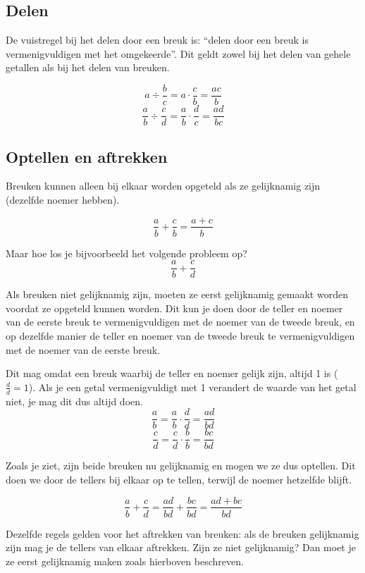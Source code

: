 \documentclass[
  a4paper,
]{scrbook}
\theoremstyle{definition}
\theoremstyle{remark}
\begin{document}
\subsection*{Delen}\label{delen}

De vuistregel bij het delen door een breuk is: ``delen door een breuk is
vermenigvuldigen met het omgekeerde''. Dit geldt zowel bij het delen van
gehele getallen als bij het delen van breuken.

\[
a\div \frac{b}{c} = a\cdot\frac{c}{b} = \frac{ac}{b}
\] \[
\frac{a}{b}\div\frac{c}{d} = \frac{a}{b}\cdot\frac{d}{c} = \frac{ad}{bc}
\]

\subsection*{Optellen en aftrekken}\label{optellen-en-aftrekken}

Breuken kunnen alleen bij elkaar worden opgeteld als ze gelijknamig zijn
(dezelfde noemer hebben).

\[
\frac{a}{b}+\frac{c}{b} = \frac{a+c}{b}
\]

Maar hoe los je bijvoorbeeld het volgende probleem op? \[
\frac{a}{b}+\frac{c}{d} 
\]

Als breuken niet gelijknamig zijn, moeten ze eerst gelijknamig gemaakt
worden voordat ze opgeteld kunnen worden. Dit kun je doen door de teller
en noemer van de eerste breuk te vermenigvuldigen met de noemer van de
tweede breuk, en op dezelfde manier de teller en noemer van de tweede
breuk te vermenigvuldigen met de noemer van de eerste breuk.

Dit mag omdat een breuk waarbij de teller en noemer gelijk zijn, altijd
1 is (\(\frac{d}{d}=1\)). Als je een getal vermenigvuldigt met 1
verandert de waarde van het getal niet, je mag dit dus altijd doen. \[
\frac{a}{b} = \frac{a}{b}\cdot\frac{d}{d} = \frac{ad}{bd}
\] \[
\frac{c}{d} = \frac{c}{d}\cdot\frac{b}{b} = \frac{bc}{bd}
\]

Zoals je ziet, zijn beide breuken nu gelijknamig en mogen we ze dus
optellen. Dit doen we door de tellers bij elkaar op te tellen, terwijl
de noemer hetzelfde blijft.

\[
\frac{a}{b}+\frac{c}{d} = \frac{ad}{bd}+\frac{bc}{bd} = \frac{ad + bc}{bd}
\]

Dezelfde regels gelden voor het aftrekken van breuken: als de breuken
gelijknamig zijn mag je de tellers van elkaar aftrekken. Zijn ze niet
gelijknamig? Dan moet je ze eerst gelijknamig maken zoals hierboven
beschreven.
\end{document}
